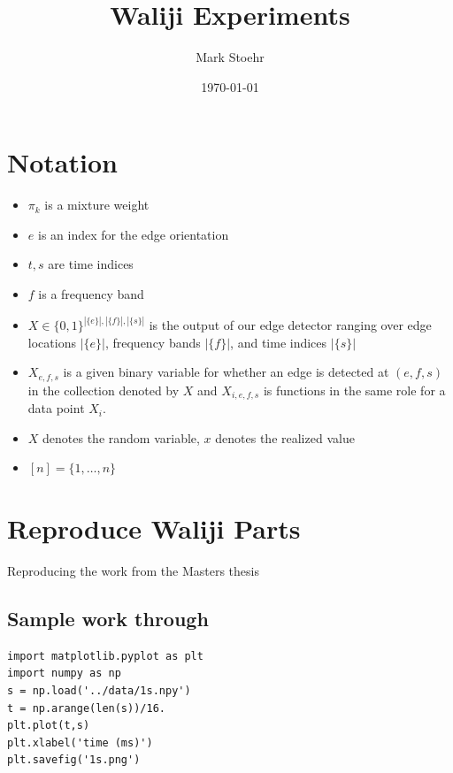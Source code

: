 \documentclass[11pt]{article}
\title{Waliji Experiments}
\author{Mark Stoehr}
\date{\today}
\begin{document}
\maketitle

\setcounter{tocdepth}{3}
\tableofcontents
\vspace*{1cm}
\section{Notation}
\label{sec-1}

\begin{itemize}
\item $\pi_k$ is a mixture weight
\item $e$ is an index for the edge orientation
\item $t,s$ are time indices
\item $f$ is a frequency band
\item $X\in \{0,1\}^{|\{e\}|,|\{f\}|,|\{s\}|}$ is the output of our edge
    detector ranging over edge locations $|\{e\}|$, frequency bands
    $|\{f\}|$, and time indices $|\{s\}|$
\item $X_{e,f,s}$ is a given binary variable for whether an edge is
    detected at $(e,f,s)$ in the collection denoted by $X$ and
    $X_{i,e,f,s}$ is functions in the same role for a data point $X_i$.
\item $X$ denotes the random variable, $x$ denotes the realized value
\item $[n]=\{1,\ldots,n\}$
\end{itemize}
\section{Reproduce Waliji Parts}
\label{sec-2}

Reproducing the work from the Masters thesis
\subsection{Sample work through}
\label{sec-2-1}



\begin{verbatim}
import matplotlib.pyplot as plt
import numpy as np
s = np.load('../data/1s.npy')
t = np.arange(len(s))/16.
plt.plot(t,s)
plt.xlabel('time (ms)')
plt.savefig('1s.png')
\end{verbatim}
\end{document}
